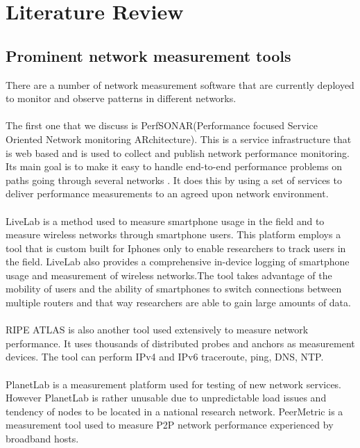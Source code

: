 \section{Literature Review}
\subsection{Prominent network measurement tools}
There are a number of network measurement software
that are currently deployed to monitor and observe patterns in different networks.
\paragraph{}
The first one that we discuss is PerfSONAR(Performance focused
Service Oriented Network monitoring ARchitecture)\cite{10.1007/11596141_19}. This is a service infrastructure that is web based and is used to collect and publish network performance monitoring\cite{article2}. Its main goal is to make it easy to handle end-to-end performance problems on paths going through several networks \cite{article2}. It does this by using a set of services to deliver performance measurements to an agreed upon network environment.

\paragraph{}
LiveLab is a method used to measure smartphone usage in the field and to measure wireless networks through smartphone users\cite{article3}. This platform employs a tool that is custom built for Iphones only to enable researchers to track users in the field. LiveLab also provides a comprehensive in-device logging of smartphone usage and measurement of wireless
networks\cite{article3}.The tool takes advantage of the mobility
of users and the ability of smartphones to switch connections between multiple routers and that way researchers are able to gain large amounts of data\cite{article3}.

\paragraph{}
RIPE ATLAS is also another tool used extensively
to measure network performance. It uses thousands of
distributed probes and anchors as measurement devices.
The tool can perform IPv4 and IPv6 traceroute, ping,
DNS, NTP\cite{7076582}.
\paragraph{}
PlanetLab is a measurement platform used for testing of new network services. However PlanetLab is rather unusable due to unpredictable load issues and tendency of nodes to be located in a national research network\cite{7076582}.
PeerMetric is a measurement tool used to measure P2P network performance experienced by broadband hosts\cite{7076582}.
